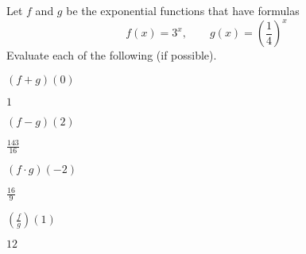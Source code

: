 \begin{exercises}
\begin{problem}
Let $f$ and $g$ be the exponential functions that have formulas
\[
	f(x)=3^x, \qquad g(x)=\left( \frac{1}{4} \right)^x
\]
Evaluate each of the following (if possible).
\begin{multicols}{4}
	\begin{subproblem}
		$(f+g)(0)$ 
		\begin{shortsolution}
			$1$ 
		\end{shortsolution}
	\end{subproblem}
	\begin{subproblem}
		$(f-g)(2)$ 
		\begin{shortsolution}
			$\frac{143}{16}$ 
		\end{shortsolution}
	\end{subproblem}
	\begin{subproblem}
		$(f\cdot g)(-2)$ 
		\begin{shortsolution}
			$\frac{16}{9}$ 
		\end{shortsolution}
	\end{subproblem}
	\begin{subproblem}
		$\left( \frac{f}{g} \right)(1)$ 
		\begin{shortsolution}
			$12$ 
		\end{shortsolution}
	\end{subproblem}
\end{multicols}
\end{problem}
			

\end{exercises}
